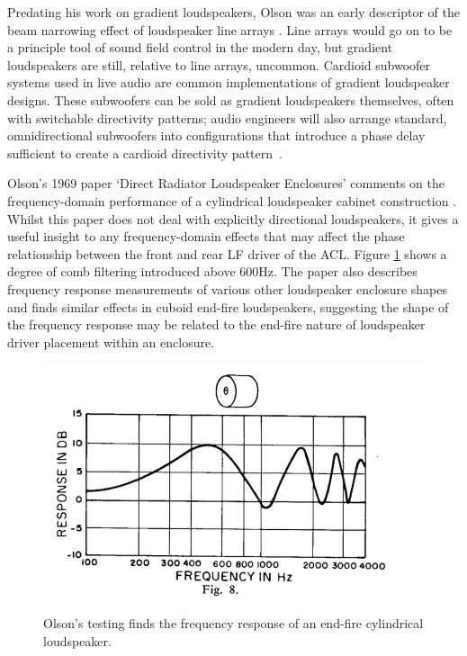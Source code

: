 \documentclass{report}
\begin{document}
        Predating his work on gradient loudspeakers, Olson was an early descriptor of the beam narrowing effect of loudspeaker line arrays \cite{olson1957acoustical}.
        Line arrays would go on to be a principle tool of sound field control in the modern day, but gradient loudspeakers are still, relative to line arrays, uncommon.
        Cardioid subwoofer systems used in live audio are common implementations of gradient loudspeaker designs.
        These subwoofers can be sold as gradient loudspeakers themselves, often with switchable directivity patterns; audio engineers will also arrange standard, omnidirectional subwoofers into configurations that introduce a phase delay sufficient to create a cardioid directivity pattern~\cite{curtis2022cardioidsubs}.
        
        Olson's 1969 paper `Direct Radiator Loudspeaker Enclosures' comments on the frequency-domain performance of a cylindrical loudspeaker cabinet construction \cite{olson1969direct}.
        Whilst this paper does not deal with explicitly directional loudspeakers, it gives a useful insight to any frequency-domain effects that may affect the phase relationship between the front and rear LF driver of the ACL.
        Figure \ref{olsonCylinder} shows a degree of comb filtering introduced above 600Hz.
        The paper also describes frequency response measurements of various other loudspeaker enclosure shapes and finds similar effects in cuboid end-fire loudspeakers, suggesting the shape of the frequency response may be related to the end-fire nature of loudspeaker driver placement within an enclosure.
        
        \begin{figure}[H]
            \centering
            \includegraphics[width = 0.7\linewidth]{figs/olsonCylinder.png}
            \caption{Olson's testing finds the frequency response of an end-fire cylindrical loudspeaker.}
            \label{olsonCylinder}
        \end{figure}
\end{document}
